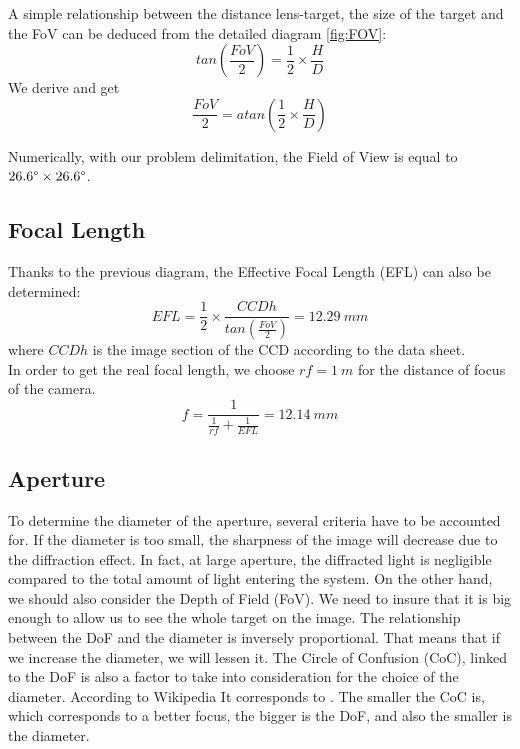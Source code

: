 A simple relationship between the distance lens-target, the size of the target and the FoV can be deduced from the detailed diagram \ref{fig:FOV}: 
\begin{equation*}
tan( \frac{FoV}{2}) = \frac{1}{2} \times \frac{H}{D}
\end{equation*}
We derive and get
\begin{equation*}
 \frac{FoV}{2} = atan(\frac{1}{2} \times \frac{H}{D})
\end{equation*}

Numerically, with our problem delimitation, the Field of View is equal to $26.6\degree \times 26.6\degree$. 

\subsection{Focal Length}
Thanks to the previous diagram, the Effective Focal Length (EFL) can also be determined: 
\begin{equation*}
EFL = \frac{1}{2} \times \frac{CCDh}{tan(\frac{FoV}{2})} = 12.29 \ mm
\end{equation*}
where $CCDh$ is the image section of the CCD according to the data sheet.\\

In order to get the real focal length, we choose $rf = 1 \ m$ for the distance of focus of the camera. 
\begin{equation*}
f = \frac{1}{\frac{1}{rf}+\frac{1}{EFL}} = 12.14 \ mm
\end{equation*}

\subsection{Aperture}
To determine the diameter of the aperture, several criteria have to be accounted for. If the diameter is too small, the sharpness of the image will decrease due to the diffraction effect. In fact, at large aperture, the diffracted light is negligible compared to the total amount of light entering the system. On the other hand, we should also consider the Depth of Field (FoV). We need to insure that it is big enough to allow us to see the whole target on the image. The relationship between the DoF and the diameter is inversely proportional. That means that if we increase the diameter, we will lessen it. The Circle of Confusion (CoC), linked to the DoF is also a factor to take into consideration for the choice of the diameter. According to Wikipedia \cite{wiki:coc} It corresponds to . The smaller the CoC is, which corresponds to a better focus, the bigger is the DoF, and also the smaller is the diameter.


